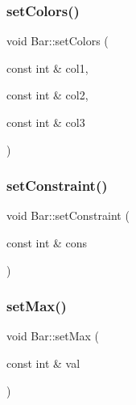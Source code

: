 \mbox{\label{class_bar_a408623411aa44075f71a9fb1aba087e3}} 
\subsubsection{\texorpdfstring{set\+Colors()}{setColors()}}
{\footnotesize\ttfamily void Bar\+::set\+Colors (\begin{DoxyParamCaption}\item[{const int \&}]{col1,  }\item[{const int \&}]{col2,  }\item[{const int \&}]{col3 }\end{DoxyParamCaption})}

\mbox{\label{class_bar_a81776d2466602e98785ad11c460d14ff}} 
\subsubsection{\texorpdfstring{set\+Constraint()}{setConstraint()}}
{\footnotesize\ttfamily void Bar\+::set\+Constraint (\begin{DoxyParamCaption}\item[{const int \&}]{cons }\end{DoxyParamCaption})\hspace{0.3cm}{\ttfamily [inline]}}

\mbox{\label{class_bar_a2e0ce34dc27f1b190d9978c90589ea58}} 
\subsubsection{\texorpdfstring{set\+Max()}{setMax()}}
{\footnotesize\ttfamily void Bar\+::set\+Max (\begin{DoxyParamCaption}\item[{const int \&}]{val }\end{DoxyParamCaption})\hspace{0.3cm}{\ttfamily [inline]}}

\mbox{\label{class_bar_a9569adedec553a3f0e59f25e7d3b8706}} 
